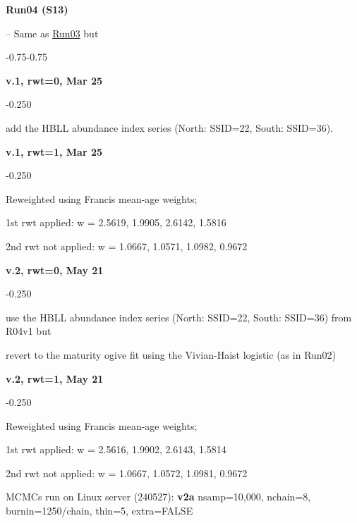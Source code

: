 \hypertarget{R04}{\textbf{Run04 (S13)}} -- Same as \hyperlink{R03}{Run03} but
\begin{itemize_csas}{-0.75}{-0.75}
	\item \textbf{v.1, rwt=0, Mar 25}
	\begin{itemize_csas}{-0.25}{0}
		\item add the HBLL abundance index series (North: SSID=22, South: SSID=36).
	\end{itemize_csas}
	\item \textbf{v.1, rwt=1, Mar 25}
	\begin{itemize_csas}{-0.25}{0}
		\item Reweighted using Francis mean-age weights;
		\item 1st rwt applied: w = 2.5619, 1.9905, 2.6142, 1.5816
		\item 2nd rwt not applied: w = 1.0667, 1.0571, 1.0982, 0.9672
	\end{itemize_csas}
	\item \textbf{v.2, rwt=0, May 21}
	\begin{itemize_csas}{-0.25}{0}
		\item use the HBLL abundance index series (North: SSID=22, South: SSID=36) from R04v1 but
		\item revert to the maturity ogive fit using the Vivian-Haist logistic (as in Run02)
	\end{itemize_csas}
	\item \textbf{v.2, rwt=1, May 21}
	\begin{itemize_csas}{-0.25}{0}
		\item Reweighted using Francis mean-age weights;
		\item 1st rwt applied: w = 2.5616, 1.9902, 2.6143, 1.5814 
		\item 2nd rwt not applied: w = 1.0667, 1.0572, 1.0981, 0.9672
		\item MCMCs run on Linux server (240527): \textbf{v2a} nsamp=10,000, nchain=8, burnin=1250/chain, thin=5, extra=FALSE
	\end{itemize_csas}
\end{itemize_csas}

